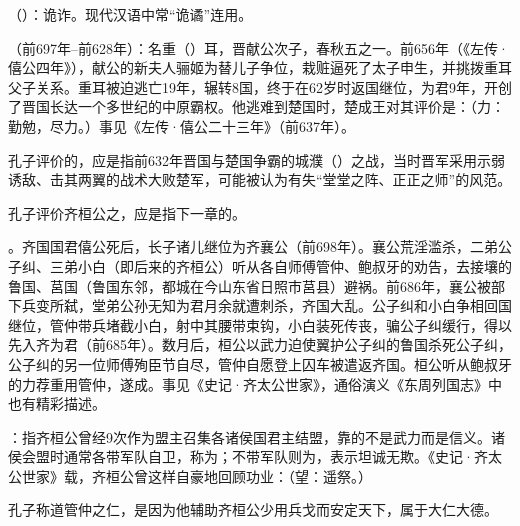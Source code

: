 {
\item {}（）：诡诈。现代汉语中常“诡谲”连用。
\item {}（前697年--前628年）：名重（）耳，晋献公次子，春秋五之一。前656年（《左传·僖公四年》），献公的新夫人骊姬为替儿子争位，栽赃逼死了太子申生，并挑拨重耳父子关系。重耳被迫逃亡19年，辗转8国，终于在62岁时返国继位，为君9年，开创了晋国长达一个多世纪的中原霸权。他逃难到楚国时，楚成王对其评价是：（力：勤勉，尽力。）事见《左传·僖公二十三年》（前637年）。

孔子评价的，应是指前632年晋国与楚国争霸的城濮（）之战，当时晋军采用示弱诱敌、击其两翼的战术大败楚军，可能被认为有失“堂堂之阵、正正之师”的风范。
\item 孔子评价齐桓公之，应是指下一章的。
}
{}  %


{
\item {}。齐国国君僖公死后，长子诸儿继位为齐襄公（前698年）。襄公荒淫滥杀，二弟公子纠、三弟小白（即后来的齐桓公）听从各自师傅管仲、鲍叔牙的劝告，去接壤的鲁国、莒国（鲁国东邻，都城在今山东省日照市莒县）避祸。前686年，襄公被部下兵变所弑，堂弟公孙无知为君月余就遭刺杀，齐国大乱。公子纠和小白争相回国继位，管仲带兵堵截小白，射中其腰带束钩，小白装死传丧，骗公子纠缓行，得以先入齐为君（前685年）。数月后，桓公以武力迫使翼护公子纠的鲁国杀死公子纠，公子纠的另一位师傅殉臣节自尽，管仲自愿登上囚车被遣返齐国。桓公听从鲍叔牙的力荐重用管仲，遂成。事见《史记·齐太公世家》，通俗演义《东周列国志》中也有精彩描述。

\item {}：指齐桓公曾经9次作为盟主召集各诸侯国君主结盟，靠的不是武力而是信义。诸侯会盟时通常各带军队自卫，称为；不带军队则为，表示坦诚无欺。《史记·齐太公世家》载，齐桓公曾这样自豪地回顾功业：（望：遥祭。）

孔子称道管仲之仁，是因为他辅助齐桓公少用兵戈而安定天下，属于大仁大德。
}
{}


